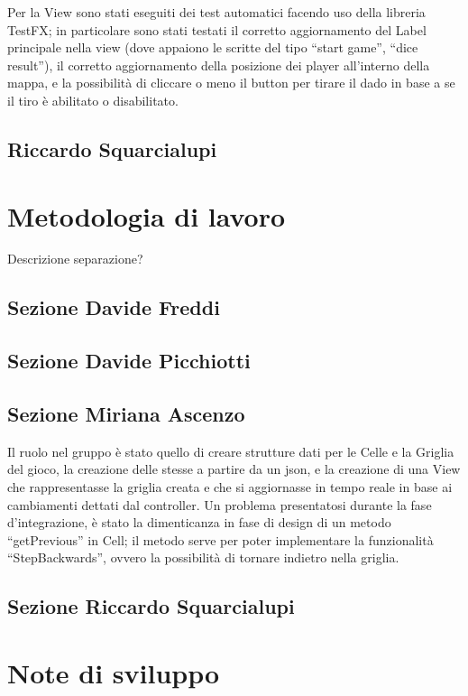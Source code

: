 \documentclass[a4paper,12pt]{report}
\begin{document}
Per la View sono stati eseguiti dei test automatici facendo uso della libreria TestFX; in particolare sono stati testati il corretto aggiornamento del Label principale nella view (dove appaiono le scritte del tipo “start game”, “dice result”),
%
il corretto aggiornamento della posizione dei player all'interno della mappa, e la possibilità di cliccare o meno il button per tirare il dado in base a se il tiro è abilitato o disabilitato.


\subsection{Riccardo Squarcialupi}

\section{Metodologia di lavoro}

Descrizione separazione?

\subsection{Sezione Davide Freddi}
\subsection{Sezione Davide Picchiotti}
\subsection{Sezione Miriana Ascenzo}

Il ruolo nel gruppo è stato quello di creare strutture dati per le Celle e la Griglia del gioco, la creazione delle stesse a partire da un json, e la creazione di una View che rappresentasse la griglia creata e che si aggiornasse in tempo reale in base ai cambiamenti dettati dal controller.
%
Un problema presentatosi durante la fase d’integrazione, è stato la dimenticanza in fase di design di un metodo “getPrevious” in Cell; il metodo serve per poter implementare la funzionalità “StepBackwards”, ovvero la possibilità di tornare indietro nella griglia.

\subsection{Sezione Riccardo Squarcialupi}


\section{Note di sviluppo}
\end{document}
